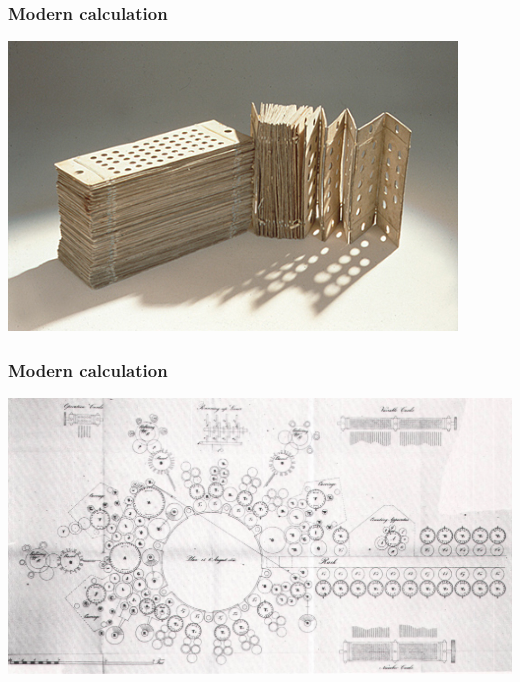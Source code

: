 \documentclass[11pt]{beamer}
\begin{document}
\begin{frame}[fragile]
  \frametitle{Modern calculation}

  \includegraphics[height=0.75\textheight]{./img/babbage-2.png}
\end{frame}

\begin{frame}[fragile]
  \frametitle{Modern calculation}

  \includegraphics[height=0.75\textheight]{./img/babbage-3.jpg}
\end{frame}
\end{document}
